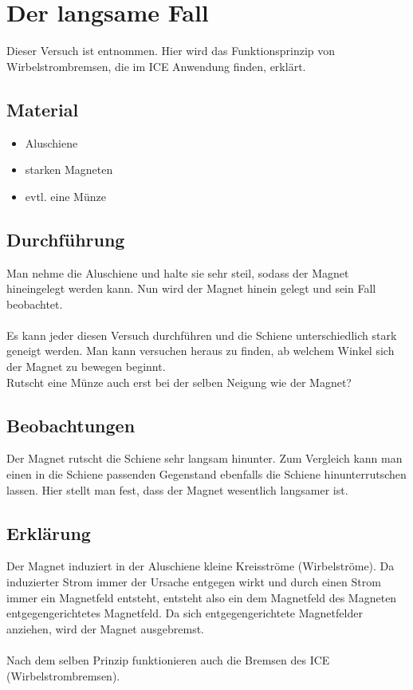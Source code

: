 \section{Der langsame Fall}

Dieser Versuch ist \cite{Physikanten} entnommen.
Hier wird das Funktionsprinzip von Wirbelstrombremsen, die im ICE Anwendung finden, erklärt.

\subsection{Material}

\begin{itemize}
	\item Aluschiene
	\item starken Magneten
	\item evtl. eine Münze
\end{itemize}

\subsection{Durchführung}

Man nehme die Aluschiene und halte sie sehr steil, sodass der Magnet hineingelegt werden kann.
Nun wird der Magnet hinein gelegt und sein \gg Fall \ll beobachtet.\\
\\
Es kann jeder diesen Versuch durchführen und die Schiene unterschiedlich stark geneigt werden.
Man kann versuchen heraus zu finden, ab welchem Winkel sich der Magnet zu bewegen beginnt.\\
Rutscht eine Münze auch erst bei der selben Neigung wie der Magnet?

\subsection{Beobachtungen}

Der Magnet rutscht die Schiene sehr langsam hinunter.
Zum Vergleich kann man einen in die Schiene passenden Gegenstand ebenfalls die Schiene hinunterrutschen lassen.
Hier stellt man fest, dass der Magnet wesentlich langsamer ist.

\subsection{Erklärung}

Der Magnet induziert in der Aluschiene kleine Kreisströme (Wirbelströme).
Da induzierter Strom immer der Ursache entgegen wirkt und durch einen Strom immer ein Magnetfeld entsteht, entsteht also ein dem Magnetfeld des Magneten entgegengerichtetes Magnetfeld.
Da sich entgegengerichtete Magnetfelder anziehen, wird der Magnet ausgebremst.\\
\\
Nach dem selben Prinzip funktionieren auch die Bremsen des ICE (Wirbelstrombremsen).

